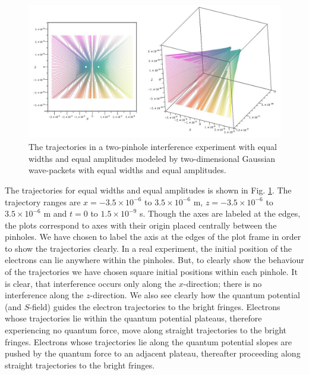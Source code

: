 \documentclass[12pt]{article}       %
\begin{document}
\begin{figure}[h]
\unitlength=1in
\hspace*{0.8in}\includegraphics[width=4.5in,height=2.36in]  {figure10.jpg}  
\caption{The trajectories in a two-pinhole interference experiment with  equal widths and equal amplitudes modeled by two-dimensional Gaussian wave-packets with equal widths and equal amplitudes.\label{TRAJEWEA}}
\end{figure}
The trajectories for equal widths and equal amplitudes is shown in Fig. \ref{TRAJEWEA}. The trajectory  ranges are $x=-3.5\times 10^{-6}$ to $3.5\times 10^{-6}$ m, $z=-3.5\times 10^{-6}$ to $3.5\times 10^{-6}$ m and $t=0$ to $1.5\times 10^{-9}$ s. Though the axes are labeled at the edges, the plots correspond to axes with their origin placed centrally between the pinholes. We have chosen to label the axis at the edges of the plot frame in order to show the trajectories clearly. In a real experiment, the initial position of the electrons can lie anywhere within the pinholes. But, to clearly show the behaviour of the trajectories we have chosen square initial positions within each pinhole. It is clear, that interference occurs only along the $x$-direction; there is no interference along the $z$-direction. We also see clearly how the quantum potential (and $S$-field)
guides the electron trajectories to the bright fringes. Electrons whose trajectories lie within the quantum potential plateaus, therefore experiencing no quantum force, move along straight trajectories to the bright fringes. Electrons whose trajectories lie along the quantum potential slopes are pushed by the quantum force to an adjacent plateau, thereafter proceeding along straight trajectories to the bright fringes.
\end{document}
